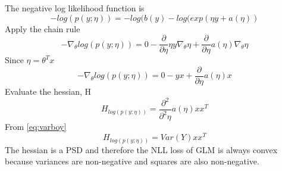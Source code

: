 \begin{answer}

The negative log likelihood function is
\begin{equation}
    -log(p(y; \eta)) = -log(b(y) - log(exp(\eta y + a(\eta))
\end{equation}
Apply the chain rule
\begin{equation}
    -\nabla_\theta log(p(y; \eta)) = 0 - \frac{\partial}{\partial \eta}\eta y \nabla_\theta \eta + \frac{\partial}{\partial \eta}a(\eta)\nabla_\theta \eta
\end{equation}
Since $\eta = \theta^T x$
\begin{equation}
    -\nabla_\theta log(p(y; \eta)) = 0 - yx + \frac{\partial}{\partial \eta}a(\eta)x
\end{equation}
Evaluate the hessian, H
\begin{equation}
    H_{log(p(y; \eta))} = \frac{\partial^2}{\partial^2 \eta}a(\eta)x x^T
\end{equation}
From \ref{eq:varboy}
\begin{equation}
    H_{log(p(y; \eta))} = Var(Y)x x^T
\end{equation}
The hessian is a PSD and therefore the NLL loss of GLM is always convex because variances are non-negative and squares are also non-negative.

\end{answer}
